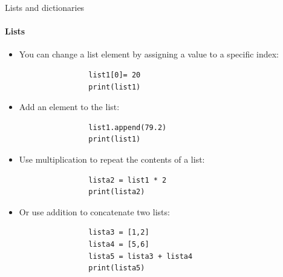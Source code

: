 \documentclass[notes,11pt, aspectratio=169, xcolor=table]{beamer}
\begin{document}
    \begin{frame}[fragile=singleslide]{Lists and dictionaries}
    \framesubtitle{Lists}
    
         \begin{itemize}
            \item You can change a list element by assigning a value to a specific index:

                \begin{verbatim}
                list1[0]= 20 
                print(list1)
                \end{verbatim}    

            \item Add an element to the list:

                \begin{verbatim}
                list1.append(79.2) 
                print(list1)
                \end{verbatim}    

            \item Use multiplication to repeat the contents of a list:

                \begin{verbatim}
                lista2 = list1 * 2 
                print(lista2)
                \end{verbatim}    

            \item Or use addition to concatenate two lists:

                \begin{verbatim}
                lista3 = [1,2]
                lista4 = [5,6]
                lista5 = lista3 + lista4
                print(lista5)
                \end{verbatim}    

        \end{itemize}       

    \end{frame}
\end{document}
